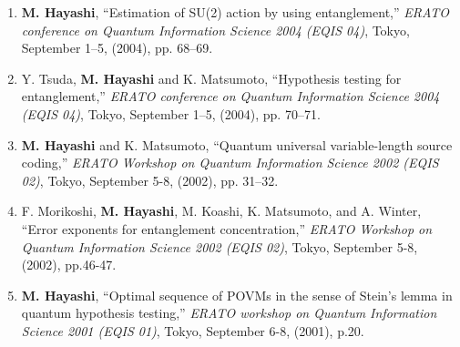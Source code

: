 \documentclass[a4paper,12pt,oneside]{article}
\begin{document}
\begin{enumerate}
\item
\textbf{M. Hayashi}, ``Estimation of SU(2) action by using entanglement,'' 
{\em ERATO conference on Quantum Information Science 2004 (EQIS 04)}, 
Tokyo, September 1--5, (2004), 
pp. 68--69.

\item
Y. Tsuda, \textbf{M. Hayashi} and K. Matsumoto, ``Hypothesis testing for entanglement,'' 
{\em ERATO conference on Quantum Information Science 2004 (EQIS 04)}, 
Tokyo, September 1--5, (2004), 
pp. 70--71.

\item
\textbf{M. Hayashi} and K. Matsumoto, ``Quantum universal variable-length source coding,'' 
{\em ERATO Workshop on Quantum Information Science 2002 (EQIS 02)}, 
Tokyo, September 5-8, (2002), 
pp. 31--32.

\item
F. Morikoshi, \textbf{M. Hayashi}, M. Koashi, K. Matsumoto, and A. Winter, ``Error exponents for entanglement concentration,'' 
{\em ERATO Workshop on Quantum Information Science 2002 (EQIS 02)}, 
Tokyo, September 5-8, (2002), 
pp.46-47.

\item
\textbf{M. Hayashi}, ``Optimal sequence of POVMs in the sense of Stein's lemma in quantum hypothesis testing,'' 
{\em ERATO workshop on Quantum Information Science 2001 (EQIS 01)}, 
Tokyo, September 6-8, (2001), p.20.

\end{enumerate}
\end{document}
